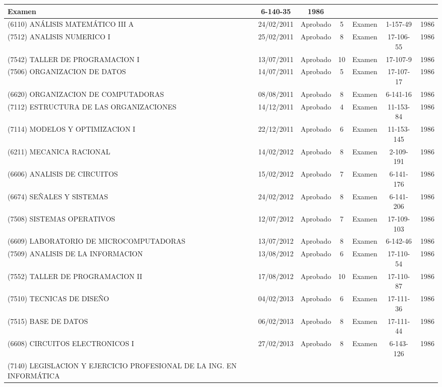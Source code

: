 \documentclass[a4paper,10pt]{article}
\begin{document}
\begin{center}
\begin{longtable}{|p{3.5cm}|c|c|c|p{1.4cm}|c|c|}
			Examen & 6-140-35 & 1986 \\
			\hline
			(6110) ANÁLISIS MATEMÁTICO III A & 24/02/2011 & Aprobado & 5 & 
			Examen & 1-157-49 & 1986 \\
			\hline
			(7512) ANALISIS NUMERICO I & 25/02/2011 & Aprobado & 8 & Examen & 
			17-106-55 & 1986 \\
			\hline
			(7542) TALLER DE PROGRAMACION I & 13/07/2011 & Aprobado & 10 & 
			Examen & 17-107-9 & 1986 \\
			\hline
			(7506) ORGANIZACION DE DATOS & 14/07/2011 & Aprobado & 5 & Examen & 
			17-107-17 & 1986 \\
			\hline
			(6620) ORGANIZACION DE COMPUTADORAS & 08/08/2011 & Aprobado & 8 & 
			Examen & 6-141-16 & 1986 \\
			\hline
			(7112) ESTRUCTURA DE LAS ORGANIZACIONES & 14/12/2011 & Aprobado & 4 
			& Examen & 11-153-84 & 1986 \\
			\hline
			(7114) MODELOS Y OPTIMIZACION I & 22/12/2011 & Aprobado & 6 & Examen
			& 11-153-145 & 1986 \\
			\hline
			(6211) MECANICA RACIONAL & 14/02/2012 & Aprobado & 8 & Examen & 
			2-109-191 & 1986 \\
			\hline
			(6606) ANALISIS DE CIRCUITOS & 15/02/2012 & Aprobado & 7 & Examen &
			6-141-176 & 1986 \\
			\hline
			(6674) SEÑALES Y SISTEMAS & 24/02/2012 & Aprobado & 8 & Examen & 
			6-141-206 & 1986 \\
			\hline
			(7508) SISTEMAS OPERATIVOS & 12/07/2012 & Aprobado & 7 & Examen & 
			17-109-103 & 1986 \\
			\hline
			(6609) LABORATORIO DE MICROCOMPUTADORAS & 13/07/2012 & Aprobado & 8
			& Examen & 6-142-46 & 1986 \\
			\hline
			(7509) ANALISIS DE LA INFORMACION & 13/08/2012 & Aprobado & 6 & 
			Examen & 17-110-54 & 1986 \\
			\hline
			(7552) TALLER DE PROGRAMACION II & 17/08/2012 & Aprobado & 10 & 
			Examen & 17-110-87 & 1986 \\
			\hline
			(7510) TECNICAS DE DISEÑO & 04/02/2013 & Aprobado & 6 & Examen & 
			17-111-36 & 1986 \\
			\hline
			(7515) BASE DE DATOS & 06/02/2013 & Aprobado & 8 & Examen & 
			17-111-44 & 1986 \\
			\hline
			(6608) CIRCUITOS ELECTRONICOS I & 27/02/2013 & Aprobado & 8 & Examen
			& 6-143-126 & 1986 \\
			\hline
			(7140) LEGISLACION Y EJERCICIO PROFESIONAL DE LA ING. EN INFORMÁTICA

\end{longtable}
\end{center}
\end{document}
